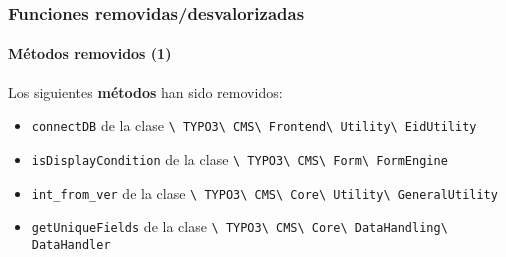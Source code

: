 \begin{frame}[fragile]
	\frametitle{Funciones removidas/desvalorizadas}
	\framesubtitle{Métodos removidos (1)}

	Los siguientes \textbf{métodos} han sido removidos:

	\begin{itemize}
		\item
			\small
				\texttt{connectDB}\newline
				de la clase
				\texttt{\textbackslash
					TYPO3\textbackslash
					CMS\textbackslash
					Frontend\textbackslash
					Utility\textbackslash
					EidUtility}
			\normalsize
		\item
			\small
				\texttt{isDisplayCondition}\newline
				de la clase
				\texttt{\textbackslash
					TYPO3\textbackslash
					CMS\textbackslash
					Form\textbackslash
					FormEngine}
			\normalsize
		\item
			\small
				\texttt{int\_from\_ver}\newline
				de la clase
				\texttt{\textbackslash
					TYPO3\textbackslash
					CMS\textbackslash
					Core\textbackslash
					Utility\textbackslash
					GeneralUtility}
			\normalsize
		\item
			\small
				\texttt{getUniqueFields}\newline
				de la clase
				\texttt{\textbackslash
					TYPO3\textbackslash
					CMS\textbackslash
					Core\textbackslash
					DataHandling\textbackslash
					DataHandler}
			\normalsize

	\end{itemize}

\end{frame}


